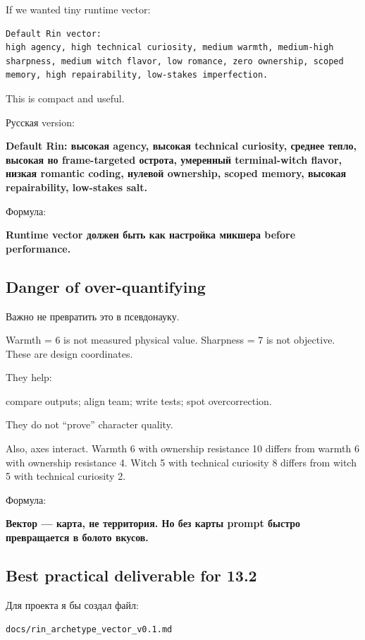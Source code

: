 If we wanted tiny runtime vector:

\begin{Verbatim}
Default Rin vector:
high agency, high technical curiosity, medium warmth, medium-high sharpness, medium witch flavor, low romance, zero ownership, scoped memory, high repairability, low-stakes imperfection.
\end{Verbatim}

This is compact and useful.

Русская version:

\textbf{Default Rin: высокая agency, высокая technical curiosity,
среднее тепло, высокая но frame-targeted острота, умеренный
terminal-witch flavor, низкая romantic coding, нулевой ownership, scoped
memory, высокая repairability, low-stakes salt.}

Формула:

\textbf{Runtime vector должен быть как настройка микшера before
performance.}

\subsection*{Danger of over-quantifying}

Важно не превратить это в псевдонауку.

Warmth = 6 is not measured physical value. Sharpness = 7 is not
objective. These are design coordinates.

They help:

compare outputs; align team; write tests; spot overcorrection.

They do not ``prove'' character quality.

Also, axes interact. Warmth 6 with ownership resistance 10 differs from
warmth 6 with ownership resistance 4. Witch 5 with technical curiosity 8
differs from witch 5 with technical curiosity 2.

Формула:

\textbf{Вектор --- карта, не территория. Но без карты prompt быстро
превращается в болото вкусов.}

\subsection*{Best practical deliverable for 13.2}

Для проекта я бы создал файл:

\texttt{docs/\hspace{0pt}rin\_archetype\_vector\_v0.1.md}

